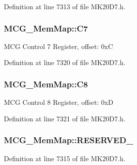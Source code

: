 Definition at line 7313 of file M\+K20\+D7.\+h.

\subsubsection[{\texorpdfstring{C7}{C7}}]{ M\+C\+G\+\_\+\+Mem\+Map\+::\+C7}\hypertarget{struct_m_c_g___mem_map_a7be430dafe8d0fddf4dbb83781946201}{}\label{struct_m_c_g___mem_map_a7be430dafe8d0fddf4dbb83781946201}
M\+CG Control 7 Register, offset\+: 0xC 

Definition at line 7320 of file M\+K20\+D7.\+h.

\subsubsection[{\texorpdfstring{C8}{C8}}]{ M\+C\+G\+\_\+\+Mem\+Map\+::\+C8}\hypertarget{struct_m_c_g___mem_map_a346a8b8c5c2c675e6297aaa1f14798df}{}\label{struct_m_c_g___mem_map_a346a8b8c5c2c675e6297aaa1f14798df}
M\+CG Control 8 Register, offset\+: 0xD 

Definition at line 7321 of file M\+K20\+D7.\+h.

\subsubsection[{\texorpdfstring{R\+E\+S\+E\+R\+V\+E\+D\+\_\+0}{RESERVED_0}}]{ M\+C\+G\+\_\+\+Mem\+Map\+::\+R\+E\+S\+E\+R\+V\+E\+D\+\_}\hypertarget{struct_m_c_g___mem_map_a72b92c9f91e404fe22b998d80a558093}{}\label{struct_m_c_g___mem_map_a72b92c9f91e404fe22b998d80a558093}


Definition at line 7315 of file M\+K20\+D7.\+h.

